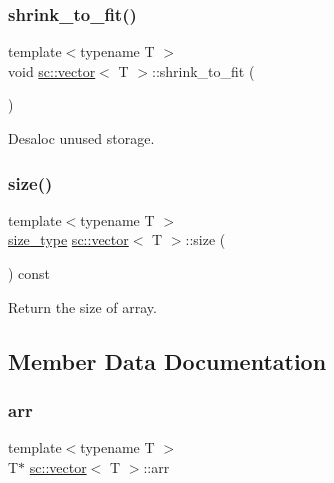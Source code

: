 \mbox{\label{classsc_1_1vector_aaeb01dacb26f39fb08cffc6f274284fd}} 
\subsubsection{\texorpdfstring{shrink\+\_\+to\+\_\+fit()}{shrink\_to\_fit()}}
{\footnotesize\ttfamily template$<$typename T $>$ \\
void \hyperlink{classsc_1_1vector}{sc\+::vector}$<$ T $>$\+::shrink\+\_\+to\+\_\+fit (\begin{DoxyParamCaption}{ }\end{DoxyParamCaption})\hspace{0.3cm}{\ttfamily [inline]}}



Desaloc unused storage. 

\mbox{\label{classsc_1_1vector_a1a2113e8d3d4c1494a929d55237d6dde}} 
\subsubsection{\texorpdfstring{size()}{size()}}
{\footnotesize\ttfamily template$<$typename T $>$ \\
\hyperlink{classsc_1_1vector_aa4500ebad5be45f8d469fc4b5d62b19d}{size\+\_\+type} \hyperlink{classsc_1_1vector}{sc\+::vector}$<$ T $>$\+::size (\begin{DoxyParamCaption}{ }\end{DoxyParamCaption}) const\hspace{0.3cm}{\ttfamily [inline]}}



Return the size of array. 



\subsection{Member Data Documentation}
\mbox{\label{classsc_1_1vector_a76dc24c57c0f431c72593f01213ec6f9}} 
\subsubsection{\texorpdfstring{arr}{arr}}
{\footnotesize\ttfamily template$<$typename T $>$ \\
T$\ast$ \hyperlink{classsc_1_1vector}{sc\+::vector}$<$ T $>$\+::arr\hspace{0.3cm}{\ttfamily [private]}}

